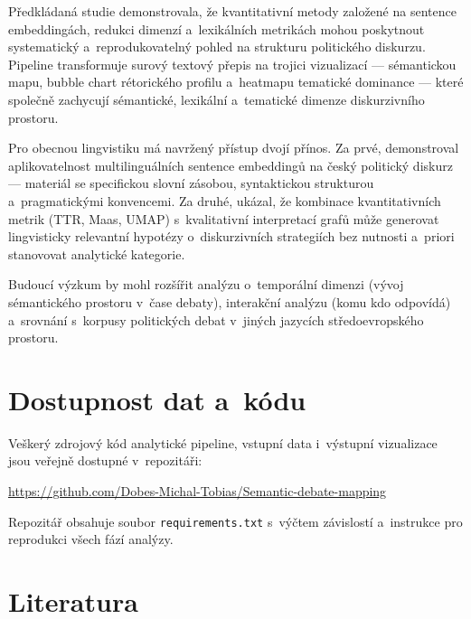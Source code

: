 \documentclass[12pt, a4paper]{article}
\begin{document}
Předkládaná studie demonstrovala, že kvantitativní metody založené na
sentence embeddingách, redukci dimenzí a~lexikálních metrikách mohou
poskytnout systematický a~reprodukovatelný pohled na strukturu politického
diskurzu. Pipeline transformuje surový textový přepis na trojici
vizualizací — sémantickou mapu, bubble chart rétorického profilu
a~heatmapu tematické dominance — které společně zachycují sémantické,
lexikální a~tematické dimenze diskurzivního prostoru.

Pro obecnou lingvistiku má navržený přístup dvojí přínos. Za prvé,
demonstroval aplikovatelnost multilinguálních sentence embeddingů na
český politický diskurz — materiál se specifickou slovní zásobou,
syntaktickou strukturou a~pragmatickými konvencemi. Za druhé, ukázal,
že kombinace kvantitativních metrik (TTR, Maas, UMAP) s~kvalitativní
interpretací grafů může generovat lingvisticky relevantní hypotézy
o~diskurzivních strategiích bez nutnosti a~priori stanovovat analytické
kategorie.

Budoucí výzkum by mohl rozšířit analýzu o~temporální dimenzi (vývoj
sémantického prostoru v~čase debaty), interakční analýzu (komu kdo
odpovídá) a~srovnání s~korpusy politických debat v~jiných
jazycích středoevropského prostoru.

\section*{Dostupnost dat a~kódu}

Veškerý zdrojový kód analytické pipeline, vstupní data i~výstupní
vizualizace jsou veřejně dostupné v~repozitáři:

\begin{center}
\url{https://github.com/Dobes-Michal-Tobias/Semantic-debate-mapping}
\end{center}

\noindent Repozitář obsahuje soubor \texttt{requirements.txt} s~výčtem
závislostí a~instrukce pro reprodukci všech fází analýzy.

\section*{Literatura}
\end{document}

